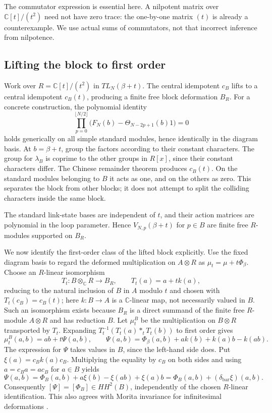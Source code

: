 \documentclass[a4paper,11pt,oneside,reqno]{amsart}
\theoremstyle{definition}
\numberwithin{equation}{section}
\begin{document}
	The commutator expression is essential here.  A nilpotent matrix over
	$\mathbb C[t]/(t^2)$ need not have zero trace: the one-by-one matrix
	$(t)$ is already a counterexample.  We use actual sums of
	commutators, not that incorrect inference from nilpotence.
	
	\subsection{Lifting the block to first order}
	Work over $R=\mathbb C[t]/(t^2)$ in $TL_N(\beta+t)$.  The central
	idempotent $c_B$ lifts to a central idempotent $c_B(t)$, producing a
	finite free block deformation $B_R$.
	For a concrete construction, the polynomial identity
	\begin{equation}\label{tl:F-annihilator}
		\prod_{p=0}^{\lfloor N/2\rfloor}
		\bigl(F_N(b)-\Theta_{N-2p+1}(b)1\bigr)=0
	\end{equation}
	holds generically on all simple standard modules, hence identically
	in the diagram basis.  At $b=\beta+t$, group the factors according
	to their constant characters.  The group for $\lambda_B$ is
	coprime to the other groups in $R[x]$, since their constant
	characters differ.  The Chinese remainder theorem produces
	$c_B(t)$.  On the standard modules belonging to $B$ it acts as one,
	and on the others as zero.  This separates the block from other
	blocks; it does not attempt to split the colliding characters
	inside the same block.
	
	The standard link-state bases are independent of $t$, and their action
	matrices are polynomial in the loop parameter. Hence
	$V_{N,p}(\beta+t)$ for $p\in B$ are finite free $R$-modules
	supported on $B_R$.

	We now identify the first-order class of the lifted block explicitly.
	Use the fixed diagram basis to regard the deformed multiplication on
	$A\otimes R$ as $\mu_t=\mu+t\Phi_\beta$. Choose an $R$-linear
	isomorphism
	\[
	 T_t:B\otimes_{\mathbb C}R\longrightarrow B_R,
	 \qquad T_t(a)=a+t k(a),
	\]
	reducing to the natural inclusion of $B$ in $A$ modulo $t$ and
	chosen with $T_t(c_B)=c_B(t)$; here $k:B\to A$ is a
	$\mathbb C$-linear map, not necessarily valued in $B$.
	Such an isomorphism exists because $B_R$ is a direct summand of the
	finite free $R$-module $A\otimes R$ and has reduction $B$.
	Let $\mu_t^B$ be the multiplication on $B\otimes R$ transported by
	$T_t$. Expanding
	$T_t^{-1}(T_t(a)*_t T_t(b))$ to first order gives
	\[
	 \mu_t^B(a,b)=ab+t\Psi(a,b),\qquad
	 \Psi(a,b)=\Phi_\beta(a,b)+a k(b)+k(a)b-k(ab).
	\]
	The expression for $\Psi$ takes values in $B$, since the left-hand
	side does. Put $\xi(a)=c_Bk(a)c_B$. Multiplying the equality by
	$c_B$ on both sides and using $a=c_Ba=ac_B$ for $a\in B$ yields
	\begin{equation}\label{tl:block-deformation-comparison}
	 \boxed{
	 \Psi(a,b)=\Phi_B(a,b)+a\xi(b)-\xi(ab)+\xi(a)b
	 =\Phi_B(a,b)+(\delta_{\mathrm{bar}}\xi)(a,b).}
	\end{equation}
	Consequently $[\Psi]=[\Phi_B]\in HH^2(B)$, independently
	of the chosen $R$-linear identification. This also agrees with
	Morita invariance for infinitesimal deformations \cite{Transfer}.
	
\end{document}
